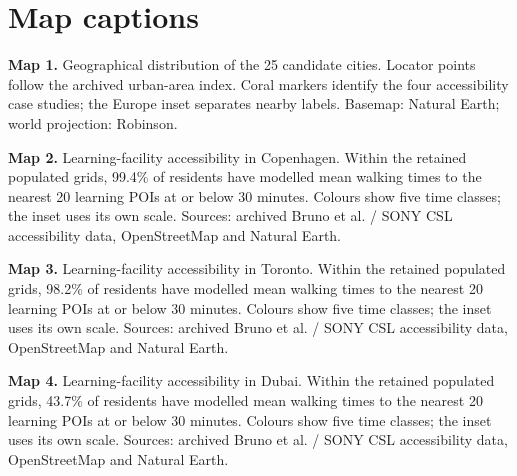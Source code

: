 \providecommand{\MapAtlasDir}{research/2026-a/visuals/cartography}







\clearpage
\section*{Map captions}
\normalsize
\noindent\textbf{Map 1.} Geographical distribution of the 25 candidate cities. Locator points follow the archived urban-area index. Coral markers identify the four accessibility case studies; the Europe inset separates nearby labels. Basemap: Natural Earth; world projection: Robinson.\par\medskip
\noindent\textbf{Map 2.} Learning-facility accessibility in Copenhagen. Within the retained populated grids, 99.4\% of residents have modelled mean walking times to the nearest 20 learning POIs at or below 30 minutes. Colours show five time classes; the inset uses its own scale. Sources: archived Bruno et al. / SONY CSL accessibility data, OpenStreetMap and Natural Earth.\par\medskip
\noindent\textbf{Map 3.} Learning-facility accessibility in Toronto. Within the retained populated grids, 98.2\% of residents have modelled mean walking times to the nearest 20 learning POIs at or below 30 minutes. Colours show five time classes; the inset uses its own scale. Sources: archived Bruno et al. / SONY CSL accessibility data, OpenStreetMap and Natural Earth.\par\medskip
\noindent\textbf{Map 4.} Learning-facility accessibility in Dubai. Within the retained populated grids, 43.7\% of residents have modelled mean walking times to the nearest 20 learning POIs at or below 30 minutes. Colours show five time classes; the inset uses its own scale. Sources: archived Bruno et al. / SONY CSL accessibility data, OpenStreetMap and Natural Earth.\par\medskip
